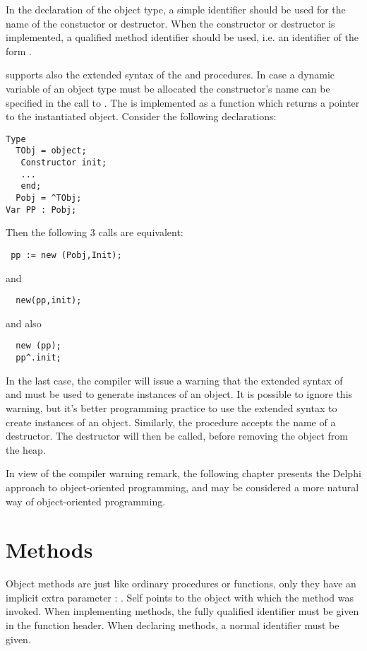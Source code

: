 In the declaration of the object type, a simple identifier should be used
for the name of the constuctor or destructor. When the constructor or destructor
is implemented, a qualified method identifier should be used,
i.e. an identifier of the form .

\fpc supports also the extended syntax of the  and 
procedures. In case a dynamic variable of an object type must be allocated
the constructor's name can be specified in the call to .
The  is implemented as a function which returns a pointer to the
instantiated object. Consider the following declarations:
\begin{verbatim}
Type
  TObj = object;
   Constructor init;
   ...
   end;
  Pobj = ^TObj;
Var PP : Pobj;
\end{verbatim}
Then the following 3 calls are equivalent:
\begin{verbatim}
 pp := new (Pobj,Init);
\end{verbatim}
and
\begin{verbatim}
  new(pp,init);
\end{verbatim}
and also
\begin{verbatim}
  new (pp);
  pp^.init;
\end{verbatim}
In the last case, the compiler will issue a warning that the
extended syntax of  and  must be used to generate instances of an
object. It is possible to ignore this warning, but it's better programming practice to
use the extended syntax to create instances of an object.
Similarly, the  procedure accepts the name of a destructor. The
destructor will then be called, before removing the object from the heap.

In view of the compiler warning remark, the following chapter presents the
Delphi approach to object-oriented programming, and may be considered a
more natural way of object-oriented programming.

\section{Methods}
Object methods are just like ordinary procedures or functions, only they
have an implicit extra parameter : . Self points to the object
with which the method was invoked.
When implementing methods, the fully qualified identifier must be given
in the function header. When declaring methods, a normal identifier must be
given.

